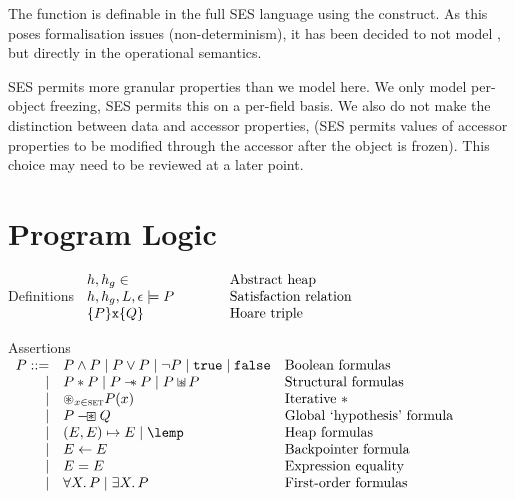 \documentclass[a4paper]{article}
\begin{document}
The  function is definable in the full SES language using the
 construct. As this poses formalisation issues (non-determinism),
it has been decided to not model , but  directly in the
operational semantics.

SES permits more granular properties than we model here. We only model
per-object freezing, SES permits this on a per-field basis. We also do not make
the distinction between data and accessor properties, (SES permits values of
accessor properties to be modified through the accessor after the object is
frozen). This choice may need to be reviewed at a later point.

\section{Program Logic}

\newcommand{\defline}[2]{#1 & \qquad & \text{#2}\\}
\begin{display}{Definitions}
  $\begin{array}{lll}
    \defline{h,h_g \in}{Abstract heap}
    \defline{h,h_g,L,\env \satisfies P}{Satisfaction relation}
    \defline{\tr{P}{\js{x}}{Q}}{Hoare triple}
  \end{array}$
\end{display}

\newcommand{\asrtline}[3][\pipe]{#1 & #2 & \text{#3}\\}
\begin{display}{Assertions}
  $\begin{array}{rll}
    \asrtline[P ::=]{P \land P \pipe P \lor P \pipe \lnot P \pipe \true \pipe
    \false}{Boolean formulas}
    \asrtline{P \sep P \pipe P \wand P \pipe P \sepish P}{Structural formulas}
    \asrtline{\bigsep_{x \in \T{set}} P(x)}{Iterative $\sep$}
    \asrtline{P \boxwand Q}{Global `hypothesis' formula}
    \asrtline{(E,E) \pointsto E \pipe \lemp}{Heap formulas}
    \asrtline{E \bp E}{Backpointer formula}
    \asrtline{E = E}{Expression equality}
    \asrtline{\forall X \st P \pipe \exists X \st P}{First-order formulas}
  \end{array}$
\end{display}
\end{document}

